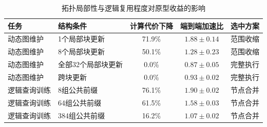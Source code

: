 \begin{table}[htbp]
    \centering
    \scriptsize
    \setlength{\tabcolsep}{4pt}
    \renewcommand\arraystretch{1.2}
    \caption{拓扑局部性与逻辑复用程度对原型收益的影响}
    \label{tab:prototype_structure_effects}
    \begin{tabular}{p{2.0cm}p{3.4cm}ccc}
        \toprule
        任务 & 结构条件 & 计算代价下降 & 端到端加速比 & 选中方案 \\
        \midrule
        动态图维护 & 1个局部块更新 & 71.9\% & $1.88\pm0.14$ & 范围收缩 \\
        动态图维护 & 8个局部块更新 & 50.1\% & $1.28\pm0.23$ & 范围收缩 \\
        动态图维护 & 全部32个局部块更新 & 0.0\% & $0.87\pm0.05$ & 完整执行 \\
        动态图维护 & 跨块更新 & 0.0\% & $0.93\pm0.02$ & 完整执行 \\
        逻辑查询训练 & 8组公共前缀 & 76.1\% & $1.90\pm0.02$ & 节点合并 \\
        逻辑查询训练 & 64组公共前缀 & 61.5\% & $1.58\pm0.03$ & 节点合并 \\
        逻辑查询训练 & 384组公共前缀 & 16.2\% & $1.07\pm0.02$ & 节点合并 \\
        \bottomrule
    \end{tabular}
\end{table}
